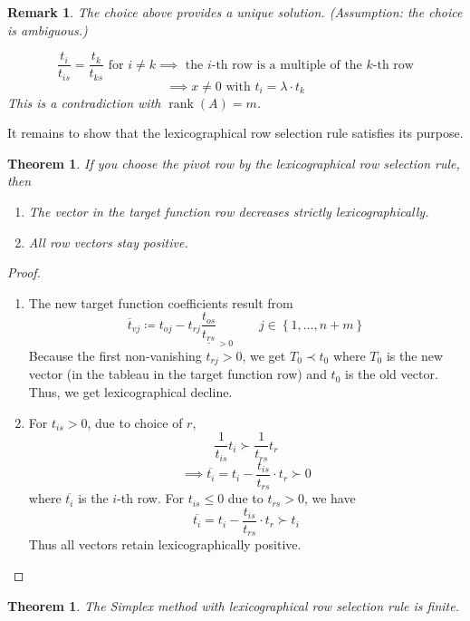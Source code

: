 \documentclass[a4paper]{article}
\newcounter{lecref}[subsection]
\numberwithin{lecref}{subsection}
\newtheorem{theorem}[lecref]{Theorem}
\newtheorem*{Remark}{Remark}
\newcommand{\Set}[1]{\left\{#1\right\}}
\begin{document}
\begin{Remark}
	The choice above provides a unique solution.
	(Assumption: the choice is ambiguous.)

	\[ \frac{t_{i}}{t_{is}} = \frac{t_k}{t_{ks}} \text{ for } i \neq k \implies \text{ the $i$-th row is a multiple of the $k$-th row} \]
	\[ \implies x \neq 0 \text{ with } t_i = \lambda \cdot t_k \]
	This is a contradiction with $\operatorname{rank}(A) = m$.
\end{Remark}

It remains to show that the lexicographical row selection rule satisfies its purpose.

\begin{theorem}
	\label{theorem:2.2}
	If you choose the pivot row by the lexicographical row selection rule, then
	\begin{enumerate}
		\item The vector in the target function row decreases strictly lexicographically.
		\item All row vectors stay positive.
	\end{enumerate}
\end{theorem}

\begin{proof}
	\begin{enumerate}
		\item The new target function coefficients result from
			\[ \overline{t}_{vj} \coloneqq t_{oj} - t_{rj} \underline{\frac{t_{os}}{t_{rs}}}_{> 0} \qquad j \in \Set{1, \dots, n+m} \]
			Because the first non-vanishing $t_{rj} > 0$, we get $T_0 \prec t_0$ where $T_0$ is the new vector (in the tableau in the target function row) and $t_0$ is the old vector.
			Thus, we get lexicographical decline.
		\item For $t_{is} > 0$, due to choice of $r$,
			\[ \frac{1}{t_{is}} t_i \succ \frac{1}{t_{rs}} t_r \]
			\[ \implies \overline{t_i} = t_i - \frac{t_{is}}{t_{rs}} \cdot t_r \succ 0 \]
			where $\overline{t_i}$ is the $i$-th row. For $t_{is} \leq 0$ due to $t_{rs} > 0$, we have
			\[ \overline{t_i} = t_i - \frac{t_{is}}{t_{rs}} \cdot t_r \succ t_i \]
			Thus all vectors retain lexicographically positive.
	\end{enumerate}
\end{proof}

\begin{theorem}
	\label{theorem:2.3}
	The Simplex method with lexicographical row selection rule is finite.
\end{theorem}
\end{document}
